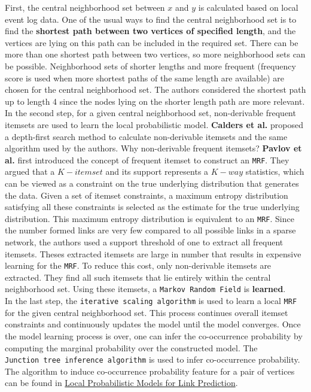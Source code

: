 First, the central neighborhood set between \(x\) and \(y\) is
calculated based on local event log data. One of the usual ways to find
the central neighborhood set is to find the \textbf{shortest path
    between two vertices of specified length}, and the vertices are lying on
this path can be included in the required set. There can be more than
one shortest path between two vertices, so more neighborhood sets can be
possible. Neighborhood sets of shorter lengths and more frequent
(frequency score is used when more shortest paths of the same length are
available) are chosen for the central neighborhood set. The authors
considered the shortest path up to length 4 since the nodes lying on the
shorter length path are more relevant.\\

In the second step, for a given central neighborhood set, non-derivable
frequent itemsets are used to learn the local probabilistic model.
\textbf{Calders et al.} proposed a depth-first search method to
calculate non-derivable itemsets and the same algorithm used by the
authors. Why non-derivable frequent itemsets? \textbf{Pavlov et al.}
first introduced the concept of frequent itemset to construct an
\texttt{MRF}. They argued that a \(K-itemset\) and its support
represents a \(K-way\) statistics, which can be viewed as a constraint
on the true underlying distribution that generates the data. Given a set
of itemset constraints, a maximum entropy distribution satisfying all
these constraints is selected as the estimate for the true underlying
distribution. This maximum entropy distribution is equivalent to an
\texttt{MRF}. Since the number formed links are very few compared to all
possible links in a sparse network, the authors used a support threshold
of one to extract all frequent itemsets. Theses extracted itemsets are
large in number that results in expensive learning for the \texttt{MRF}.
To reduce this cost, only non-derivable itemsets are extracted. They
find all such itemsets that lie entirely within the central neighborhood
set. Using these itemsets, a \texttt{Markov\ Random\ Field} is
\textbf{learned}.\\

In the last step, the \texttt{iterative\ scaling\ algorithm} is used to
learn a local \texttt{MRF} for the given central neighborhood set. This
process continues overall itemset constraints and continuously updates
the model until the model converges. Once the model learning process is
over, one can infer the co-occurrence probability by computing the
marginal probability over the constructed model. The
\texttt{Junction\ tree\ inference\ algorithm} is used to infer
co-occurrence probability. The algorithm to induce co-occurrence
probability feature for a pair of vertices can be found in
\href{https://static.aminer.org/pdf/PDF/000/303/209a_parameterized_probabilistic_model_of_network_evolution_for_supervised_link.pdf}{Local
    Probabilistic Models for Link Prediction}.

